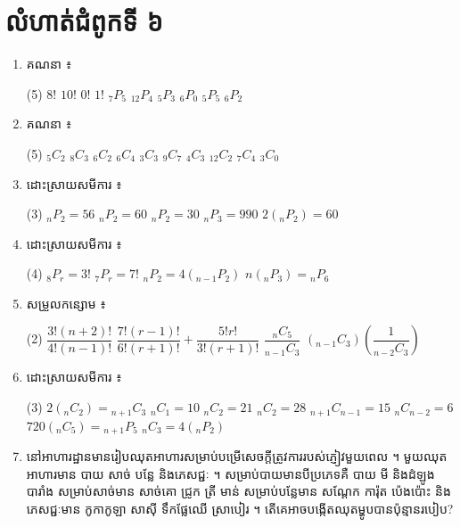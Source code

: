 \section*{លំហាត់ជំពូកទី ៦}
\begin{enumerate}[1]
  \item គណនា ៖
  \begin{tasks}(5)
    \task $8!$
    \task $10!$
    \task $0!$
    \task $1!$
    \task ${}_7P_5$
    \task ${}_{12}P_4$
    \task ${}_5P_3$
    \task ${}_6P_0$
    \task ${}_5P_5$
    \task ${}_6P_2$
  \end{tasks}
  \item គណនា ៖
  \begin{tasks}(5)
    \task ${}_5C_2$
    \task ${}_8C_3$
    \task ${}_6C_2$
    \task ${}_6C_4$
    \task ${}_3C_3$
    \task ${}_9C_7$
    \task ${}_4C_3$
    \task ${}_{12}C_2$
    \task ${}_7C_4$
    \task ${}_3C_0$
  \end{tasks}
  \item ដោះស្រាយសមីការ ៖
  \begin{tasks}(3)
    \task ${}_nP_2 = 56$
    \task ${}_nP_2 = 60$
    \task ${}_nP_2 = 30$
    \task ${}_nP_3 = 990$
    \task $2({}_nP_2) = 60$
  \end{tasks}
  \item ដោះស្រាយសមីការ ៖
  \begin{tasks}(4)
    \task ${}_8P_r = 3!$
    \task ${}_7P_r = 7!$
    \task ${}_nP_2 = 4({}_{n-1}P_2)$
    \task $n({}_nP_3) = {}_nP_6$
  \end{tasks}
  \item សម្រួលកន្សោម ៖
  \begin{tasks}(2)
    \task $\dfrac{3!(n + 2)!}{4!(n - 1)!}$
    \task $\dfrac{7!(r - 1)!}{6!(r + 1)!} + \dfrac{5!r!}{3!(r + 1)!}$
    \task $\dfrac{{}_nC_5}{{}_{n-1}C_3}$
    \task $({}_{n-1}C_3)\left(\dfrac{1}{{}_{n-2}C_3}\right)$
  \end{tasks}
  \item ដោះស្រាយសមីការ ៖
  \begin{tasks}(3)
    \task $2({}_nC_2) = {}_{n+1}C_3$
    \task ${}_nC_1 = 10$
    \task ${}_nC_2 = 21$
    \task ${}_nC_2 = 28$
    \task ${}_{n+1}C_{n-1} = 15$
    \task ${}_nC_{n-2} = 6$
    \task $720({}_nC_5) = {}_{n+1}P_5$
    \task ${}_nC_3 = 4({}_nP_2)$
  \end{tasks}
  \item នៅអាហារដ្ឋានមានរៀបឈុតអាហារសម្រាប់បម្រើសេចក្ដីត្រូវការរបស់ភ្ញៀវមួយពេល ។ មួយឈុតអាហារមាន បាយ សាច់ បន្លែ និងភេសជ្ជៈ ។ សម្រាប់បាយមានបីប្រភេទគឺ បាយ មី និងដំឡូងបារាំង សម្រាប់សាច់មាន សាច់គោ ជ្រូក ត្រី មាន់ សម្រាប់បន្លែមាន សណ្ដែក ការ៉ុត ប៉េងប៉ោះ និងភេសជ្ជៈមាន កូកាកូឡា សាស៊ី ទឹកផ្លែឈើ ស្រាបៀរ ។ តើគេអាចបង្កើតឈុតម្ហូបបានប៉ុន្មានរបៀប?

\end{enumerate}
